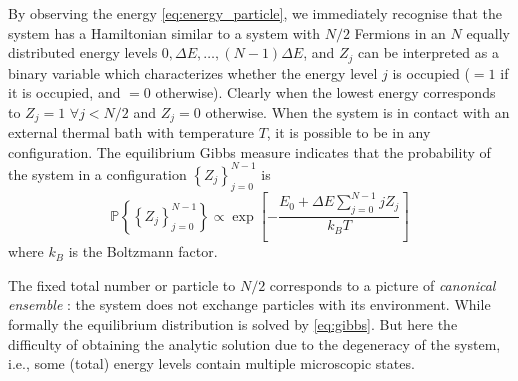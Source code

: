 \documentclass[aps,showpacs,twocolumn,floatfix,prx,superscriptaddress]{revtex4-1}
\begin{document}
By observing the energy \eqref{eq:energy_particle}, we immediately recognise
that the system has a Hamiltonian similar to a system with $N/2$ Fermions in an
$N$ equally distributed energy levels $0, \Delta E, \ldots, (N-1) \Delta E$, and
$Z_j$ can be interpreted as a binary variable which characterizes whether the
energy level $j$ is occupied ($=1$ if it is occupied, and $=0$ otherwise).  
Clearly when the lowest energy corresponds to $Z_j = 1$ $\forall j < N/2$ and
$Z_j=0$ otherwise. When the system is in contact with an external thermal bath
with temperature $T$, it is possible to be in any configuration. The equilibrium
Gibbs measure indicates that the probability of the system in a configuration
$\left\{Z_j\right\}_{j=0}^{N-1}$ is
\begin{equation}
    \label{eq:gibbs}
    \mathbb{P}\left\{\left\{Z_j\right\}_{j=0}^{N-1}\right\} \propto \exp
    \left[-\frac{E_0 + \Delta E \sum_{j=0}^{N-1} j Z_j}{k_B T}\right]
\end{equation}
where $k_B$ is the Boltzmann factor. 

The fixed total number or particle to $N/2$ corresponds to a picture of
\emph{canonical ensemble} \cite{}: the system does not exchange particles with
its environment. While formally the equilibrium distribution is solved by
\eqref{eq:gibbs}. But here the difficulty of obtaining the analytic solution due
to the degeneracy of the system, i.e., some (total) energy levels contain
multiple microscopic states. 
\end{document}
